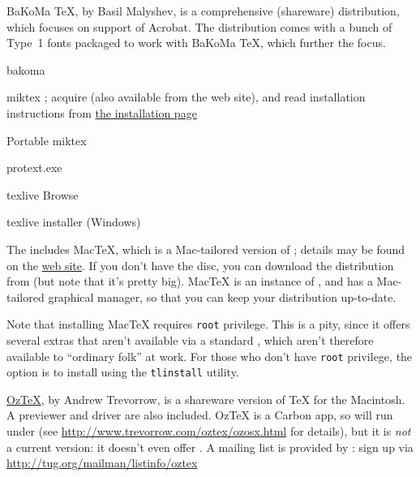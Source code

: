 BaKoMa \TeX{}, by Basil Malyshev, is a comprehensive (shareware)
distribution, which focuses on support of Acrobat.  The distribution
comes with a bunch of Type~1 fonts packaged to work with BaKoMa
\TeX{}, which further the focus.
\begin{ctanrefs}
\item[bakoma]
\item[miktex]; %
  acquire  (also available from the \miktex{}
  web site), and read installation instructions from %
  \href{http://www.miktex.org/2.9/setup}{the \miktex{} installation page}
\item[\nothtml{\bgroup\rmfamily}Portable\nothtml{\egroup} miktex] 
\item[protext.exe]
\item[texlive]Browse 
\item[texlive installer (Windows)]
\end{ctanrefs}


The   includes Mac\TeX{},
which is a Mac-tailored version of \texlive{}; details may be found on
the \href{http://tug.org/mactex}{ web site}.  If you don't
have the disc, you can download the distribution from  (but
note that it's pretty big).  Mac\TeX{} is an instance of \texlive{},
and has a Mac-tailored graphical \texlive{} manager, so that you can
keep your distribution up-to-date.

Note that installing Mac\TeX{} requires \texttt{root} privilege.  This
is a pity, since it offers several extras that aren't available via a
standard \texlive{}, which aren't therefore available to ``ordinary
folk'' at work.  For those who don't have \texttt{root} privilege, the
option is to install using the \texlive{} \texttt{tlinstall} utility.

\href{http://www.trevorrow.com/oztex/}{Oz\TeX{}}, by Andrew Trevorrow,
is a shareware version of \TeX{} for the Macintosh.  A 
previewer and \PS{} driver are also included.
Oz\TeX{} is a Carbon app, so will run under \macosx{} (see
\url{http://www.trevorrow.com/oztex/ozosx.html} for details), but it
is \emph{not} a current version: it doesn't even offer \pdftex{}.  A
mailing list is provided by : sign up via
\url{http://tug.org/mailman/listinfo/oztex}

